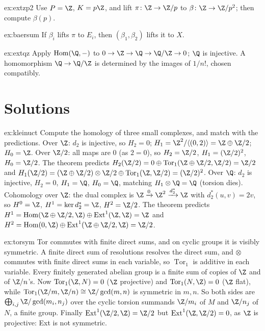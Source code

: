 \begin{hint}{ex:extzp2}
Use $P=\Z$, $K=p\Z$, and lift $\pi\colon\Z\to\Z/p$ to $\beta\colon\Z\to\Z/p^2$; then compute $\beta(p)$.
\end{hint}

\begin{hint}{ex:baersum}
If $\beta_i$ lifts $\pi$ to $E_i$, then $(\beta_1,\beta_2)$ lifts it to $X$.
\end{hint}

\begin{hint}{ex:extqz}
Apply $\operatorname{Hom}(\Q,-)$ to $0\to\Z\to\Q\to\Q/\Z\to0$; $\Q$ is injective. A homomorphism $\Q\to\Q/\Z$ is determined by the images of $1/n!$, chosen compatibly.
\end{hint}

\section{Solutions}

\begin{solution}{ex:kleinuct}
\idea Compute the homology of three small complexes, and match with the predictions.
\writeup Over $\Z$: $d_2$ is injective, so $H_2=0$; $H_1=\Z^2/\langle(0,2)\rangle=\Z\oplus\Z/2$; $H_0=\Z$. Over $\Z/2$: all maps are $0$ (as $2=0$), so $H_2=\Z/2$, $H_1=(\Z/2)^2$, $H_0=\Z/2$. The theorem predicts
$H_2(\Z/2)=0\oplus\operatorname{Tor}_1(\Z\oplus\Z/2,\Z/2)=\Z/2$ and $H_1(\Z/2)=(\Z\oplus\Z/2)\otimes\Z/2\oplus\operatorname{Tor}_1(\Z,\Z/2)=(\Z/2)^2$. Over $\Q$: $d_2$ is injective, $H_2=0$, $H_1=\Q$, $H_0=\Q$, matching
$H_1\otimes\Q=\Q$ (torsion dies). Cohomology over $\Z$: the dual complex is $\Z\xrightarrow0\Z^2\xrightarrow{d_2^*}\Z$ with $d_2^*(u,v)=2v$, so $H^0=\Z$, $H^1=\ker d_2^*=\Z$, $H^2=\Z/2$. The theorem predicts
$H^1=\operatorname{Hom}(\Z\oplus\Z/2,\Z)\oplus\operatorname{Ext}^1(\Z,\Z)=\Z$ and $H^2=\operatorname{Hom}(0,\Z)\oplus\operatorname{Ext}^1(\Z\oplus\Z/2,\Z)=\Z/2$.
\end{solution}

\begin{solution}{ex:torsym}
\idea Tor commutes with finite direct sums, and on cyclic groups it is visibly symmetric.
\writeup A finite direct sum of resolutions resolves the direct sum, and $\otimes$ commutes with finite direct sums in each variable, so $\operatorname{Tor}_1$ is additive in each variable. Every finitely generated abelian group is a
finite sum of copies of $\Z$ and of $\Z/n$'s. Now $\operatorname{Tor}_1(\Z,N)=0$ ($\Z$ projective) and $\operatorname{Tor}_1(N,\Z)=0$ ($\Z$ flat), while $\operatorname{Tor}_1(\Z/m,\Z/n)\cong\Z/\gcd(m,n)$ is symmetric in $m,n$. So both
sides are $\bigoplus_{i,j}\Z/\gcd(m_i,n_j)$ over the cyclic torsion summands $\Z/m_i$ of $M$ and $\Z/n_j$ of $N$, a finite group. Finally $\operatorname{Ext}^1(\Z/2,\Z)=\Z/2$ but
$\operatorname{Ext}^1(\Z,\Z/2)=0$, as $\Z$ is projective: Ext is not symmetric.
\end{solution}

